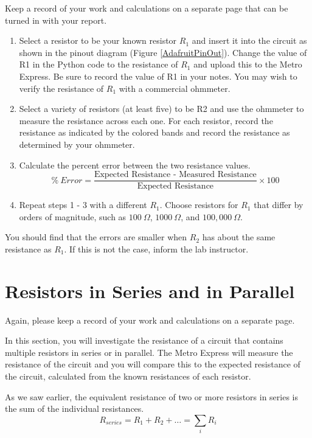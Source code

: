 \documentclass[]{article}
\begin{document}
	Keep a record of your work and calculations on a separate page that can be turned in with your report.
	\begin{enumerate}
		\item Select a resistor to be your known resistor $R_1$ and insert it into the circuit as shown in the pinout diagram (Figure \ref{AdafruitPinOut}).  Change the value of R1 in the Python code to the resistance of $R_1$ and upload this to the Metro Express.  Be sure to record the value of R1 in your notes.  You may wish to verify the resistance of $R_1$ with a commercial ohmmeter.
		\item Select a variety of resistors  (at least five) to be R2 and use the ohmmeter to measure the resistance across each one.  For each resistor, record the resistance as indicated by the colored bands and record the resistance as determined by your ohmmeter.
		\item Calculate the percent error between the two resistance values.
		\begin{equation}
			\% \ Error = \frac{\text{Expected Resistance - Measured Resistance}}{\text{Expected  Resistance}} \times 100
		\end{equation}
		\item Repeat steps 1 - 3 with a different $R_1$.  Choose resistors for $R_1$ that differ by  orders of magnitude, such as $100\ \Omega$, $1000\ \Omega$, and $100,000\ \Omega$.
	\end{enumerate}

	You should find that the errors are smaller when $R_2$ has about the same resistance as $R_1$.  If this is not the case, inform the lab instructor.
	\newpage
	\section{Resistors in Series and in Parallel}
	Again, please keep a record of your work and calculations on a separate page.

	In this section, you will investigate the resistance of a circuit that contains multiple resistors in series or in parallel.  The Metro Express will measure the resistance of the circuit and you will compare this to the expected resistance of the circuit, calculated from the known resistances of each resistor.

	As we saw earlier, the equivalent resistance of two or more resistors in series is the sum of the individual resistances.
	\begin{equation}
		R_{series} = R_1 + R_2 +\dots = \sum_i R_i
	\end{equation}
	
\end{document}
